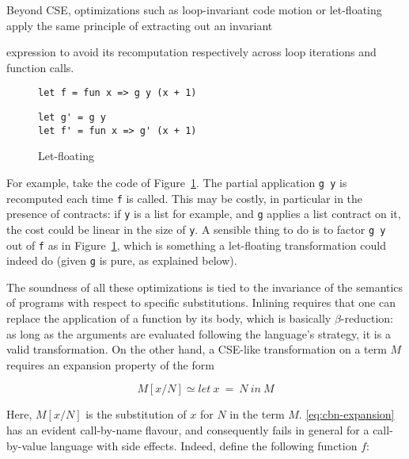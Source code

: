 \documentclass[sigplan,10pt,review,anonymous]{acmart}
\newcommand{\unsure}[2][1=]{}
\begin{document}
Beyond CSE, optimizations such as loop-invariant code motion or
let-floating~\cite{letFloating} apply the same principle of extracting out an invariant
\unsure{Was this the inteded citation?}
expression to avoid its recomputation respectively across loop iterations and
function calls.

\begin{figure}
  \begin{center}
\begin{lstlisting}[language=nickel,title={Source program}]
let f = fun x => g y (x + 1)
\end{lstlisting}
\begin{lstlisting}[language=nickel,title={Optimized program}]
let g' = g y
let f' = fun x => g' (x + 1)
\end{lstlisting}
  \end{center}
\caption{Let-floating}
\label{fig:optimizations-let-floating-ex}
\end{figure}

For example, take the code of Figure~\ref{fig:optimizations-let-floating-ex}.
The partial application \lstinline+g y+ is recomputed each time \lstinline+f+ is
called. This may be costly, in particular in the presence of contracts: if
\lstinline+y+ is a list for example, and \lstinline+g+ applies a list contract
on it, the cost could be linear in the size of \lstinline+y+. A sensible thing
to do is to factor \lstinline+g y+ out of \lstinline+f+ as in
Figure~\ref{fig:optimizations-let-floating-ex}, which is something a
let-floating transformation could indeed do (given \lstinline+g+ is pure, as
explained below).

The soundness of all these optimizations is tied to the invariance of the
semantics of programs with respect to specific substitutions. Inlining requires
that one can replace the application of a function by its body, which is
basically $\beta$-reduction: as long as the arguments are evaluated following
the language's strategy, it is a valid transformation. On the other hand,
a CSE-like transformation on a term $M$ requires an expansion property of the form

\begin{equation}\label{eq:cbn-expansion}
M[x/N] \simeq let~x~=~N~in~M
\end{equation}

Here, $M[x/N]$ is the substitution of $x$ for $N$ in the term $M$.
\ref{eq:cbn-expansion} has an evident call-by-name flavour, and consequently
fails in general for a call-by-value language with side effects.  Indeed, define
the following function $f$:
\end{document}
